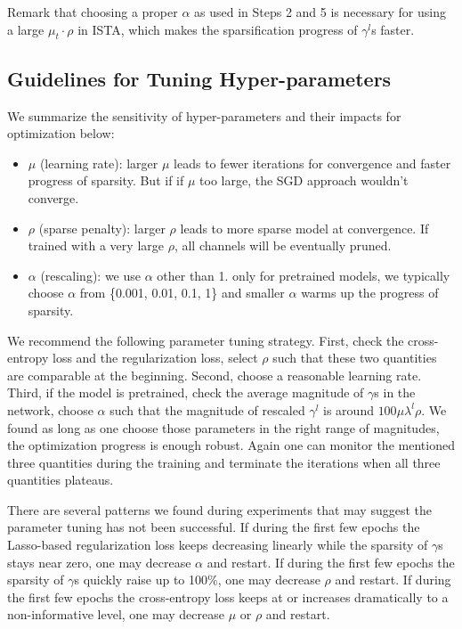 \documentclass{article} %
\begin{document}
Remark that choosing a proper $\alpha$ as used in Steps 2 and 5
is necessary for using a large $\mu_t \cdot \rho$ in ISTA, which makes
the sparsification progress of $\gamma^l$s faster.

\subsection{Guidelines for Tuning Hyper-parameters}

We summarize the sensitivity of hyper-parameters and their impacts for optimization below:
\begin{itemize}
\item $\mu$ (learning rate): larger $\mu$ leads to fewer iterations for convergence and faster progress of sparsity. But if if $\mu$ too large, the SGD approach wouldn't converge. 
\item $\rho$ (sparse penalty): larger $\rho$ leads to more sparse model at convergence. If trained with a very large $\rho$, all channels will be eventually pruned.
\item $\alpha$ (rescaling): we use $\alpha$ other than 1. only for pretrained models, we typically choose $\alpha$ from \{0.001, 0.01, 0.1, 1\} and smaller $\alpha$ warms up the progress of sparsity. 
\end{itemize}

We recommend the following parameter tuning strategy. First, check the cross-entropy loss and the regularization loss, select $\rho$ such that these two quantities are comparable at the beginning. Second, choose a reasonable learning rate. Third, if the model is pretrained, check the average magnitude of $\gamma$s in the network, choose $\alpha$ such that the magnitude of rescaled $\gamma^l$ is around $100 \mu  \lambda^l  \rho$. We found as long as one choose those parameters in the right range of magnitudes, the optimization progress is enough robust. Again one can monitor the mentioned three quantities during the training and terminate the iterations when all three quantities plateaus.

There are several patterns we found during experiments that may suggest the parameter tuning has not been successful. If during the first few epochs 
the Lasso-based regularization loss keeps decreasing linearly while the sparsity of $\gamma$s stays near zero, one may decrease $\alpha$ and restart.
If during the first few epochs the sparsity of $\gamma$s quickly raise up to 100\%, one may decrease $\rho$ and restart.  
If during the first few epochs the cross-entropy loss keeps at or increases dramatically to a non-informative level, 
one may decrease $\mu$ or $\rho$ and restart.
\end{document}
